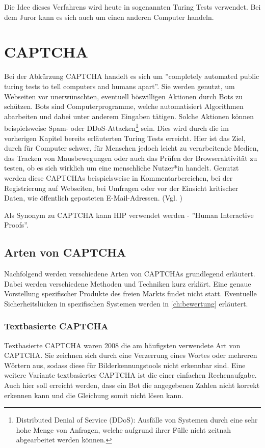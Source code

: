 Die Idee dieses Verfahrens wird heute in sogenannten Turing Tests verwendet.
Bei dem Juror kann es sich auch um einen anderen Computer handeln.

\section{CAPTCHA}
\label{ch:basics:captcha}
Bei der Abkürzung CAPTCHA handelt es sich um ''completely automated public turing tests to tell computers and humans apart''. 
Sie werden genutzt, um Webseiten vor unerwünschten, eventuell böswilligen Aktionen durch Bots zu schützen. 
Bots sind Computerprogramme, welche automatisiert Algorithmen abarbeiten und dabei unter anderem Eingaben tätigen.
Solche Aktionen können beispielsweise Spam- oder 
DDoS-Attacken\footnote[1]{Distributed Denial of Service (DDoS): Ausfälle von Systemen durch eine sehr hohe Menge von Anfragen, 
welche aufgrund ihrer Fülle nicht zeitnah abgearbeitet werden können.} sein.
Dies wird durch die im vorherigen Kapitel bereits erläuterten Turing Tests erreicht. 
Hier ist das Ziel, durch für Computer schwer, für Menschen jedoch leicht zu verarbeitende Medien, das Tracken von Mausbewegungen
oder auch das Prüfen der Browseraktivität zu testen, ob es sich wirklich um eine menschliche Nutzer*in handelt.
Genutzt werden diese CAPTCHAs beispielsweise in Kommentarbereichen, bei der Registrierung auf Webseiten,
bei Umfragen oder vor der Einsicht kritischer Daten, wie öffentlich geposteten E-Mail-Adressen. (Vgl. \cite{moradi})

Als Synonym zu CAPTCHA kann HIP verwendet werden - ''Human Interactive Proofs''. 

\subsection{Arten von CAPTCHA}
\label{ch:basics:captcha:arten}
Nachfolgend werden verschiedene Arten von CAPTCHAs grundlegend erläutert.
Dabei werden verschiedene Methoden und Techniken kurz erklärt. 
Eine genaue Vorstellung spezifischer Produkte des freien Markts findet nicht statt.
Eventuelle Sicherheitslücken in spezifischen Systemen werden in \autoref{ch:bewertung} erläutert.

\subsubsection*{Textbasierte CAPTCHA}
Textbasierte CAPTCHA waren 2008 die am häufigsten verwendete Art von CAPTCHA.
Sie zeichnen sich durch eine Verzerrung eines Wortes oder mehreren Wörtern aus, sodass diese für Bilderkennungstools nicht erkennbar sind.
Eine weitere Variante textbasierter CAPTCHA ist die einer einfachen Rechenaufgabe. 
Auch hier soll erreicht werden, dass ein Bot die angegebenen Zahlen nicht korrekt erkennen kann und die Gleichung somit nicht lösen kann. \cite[p.1]{usabilityofcaptchas} \cite[p.75]{surveyofresearch} \cite{shinde2018DIFFERENTTO} %

